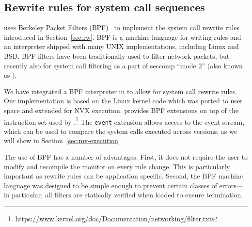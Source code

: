 \subsection{Rewrite rules for system call sequences}
\label{sec:patternmatching}

\varan uses Berkeley Packet Filters (BPF)~\cite{bpf} to implement the system call
rewrite rules introduced in Section~\ref{sec:rw}.  BPF is a machine
language for writing rules and an interpreter shipped with many UNIX
implementations, including Linux and BSD.  BPF filters have been
traditionally used to filter network packets, but recently also for
system call filtering as a part of seccomp ``mode 2'' (also known as
\seccompbpf).

We have integrated a BPF interpreter in \varan to allow for system
call rewrite rules. Our implementation is based on the Linux kernel
code which was ported to user space and extended for NVX
execution. \varan provides BPF extensions on top of the instruction set used by
\seccompbpf.\footnote{\url{https://www.kernel.org/doc/Documentation/networking/filter.txt}}
The \lstinline[language={[bpf]Assembler}]`event` extension allows access to the
event stream, which can be used to compare the system calls executed across
versions, as we will show in Section~\ref{sec:mv-execution}.




The use of BPF has a number of advantages.  First, it does not require
the user to modify and recompile the monitor on every rule
change. This is particularly important as rewrite rules can be
application specific. Second, the BPF machine language was designed to
be simple enough to prevent certain classes of errors---in particular,
all filters are statically verified when loaded to ensure termination.



